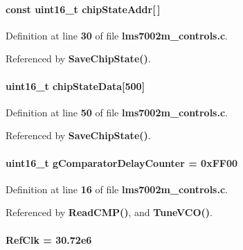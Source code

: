 \paragraph[{chip\+State\+Addr}]{\setlength{\rightskip}{0pt plus 5cm}const uint16\+\_\+t chip\+State\+Addr[$\,$]}\label{lms7002m__controls_8c_a682de9bca1495e80e5cdc39f93762093}


Definition at line {\bf 30} of file {\bf lms7002m\+\_\+controls.\+c}.



Referenced by {\bf Save\+Chip\+State()}.

\paragraph[{chip\+State\+Data}]{\setlength{\rightskip}{0pt plus 5cm}uint16\+\_\+t chip\+State\+Data[500]}\label{lms7002m__controls_8c_abd54bf616ade16f46d7ce116acb67927}


Definition at line {\bf 50} of file {\bf lms7002m\+\_\+controls.\+c}.



Referenced by {\bf Save\+Chip\+State()}.

\paragraph[{g\+Comparator\+Delay\+Counter}]{\setlength{\rightskip}{0pt plus 5cm}uint16\+\_\+t g\+Comparator\+Delay\+Counter = 0x\+F\+F00}\label{lms7002m__controls_8c_a3fcfd3dbfb4516a5f3e5b742e84efbe7}


Definition at line {\bf 16} of file {\bf lms7002m\+\_\+controls.\+c}.



Referenced by {\bf Read\+C\+M\+P()}, and {\bf Tune\+V\+C\+O()}.

\paragraph[{Ref\+Clk}]{ Ref\+Clk = 30.\+72e6}\label{lms7002m__controls_8c_ade9c63dab5fa56fdab2394edec268508}


